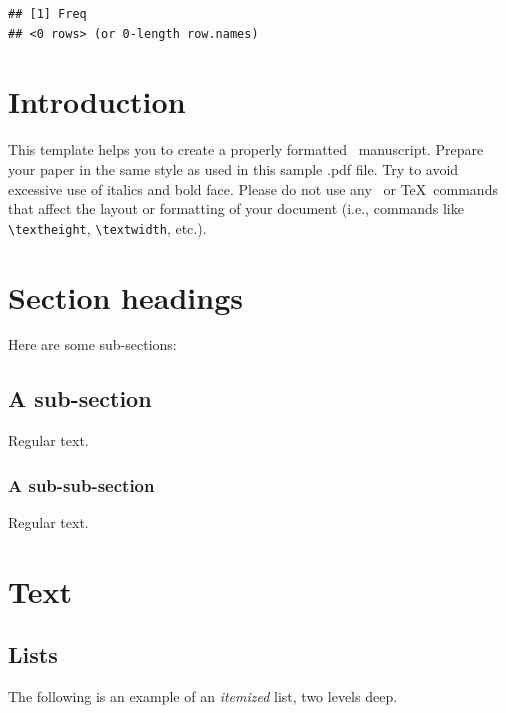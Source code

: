 \documentclass[aoas]{imsart}
\numberwithin{equation}{section}
\theoremstyle{plain}
\theoremstyle{remark}
\begin{document}
\begin{verbatim}
## [1] Freq
## <0 rows> (or 0-length row.names)
\end{verbatim}

\newpage

\hypertarget{introduction}{%
\section{Introduction}\label{introduction}}

This template helps you to create a properly formatted
\LaTeXe~manuscript. Prepare your paper in the same style as used in this
sample .pdf file. Try to avoid excessive use of italics and bold face.
Please do not use any \LaTeXe~or \TeX~commands that affect the layout or
formatting of your document (i.e., commands like \verb|\textheight|,
\verb|\textwidth|, etc.).

\hypertarget{section-headings}{%
\section{Section headings}\label{section-headings}}

Here are some sub-sections:

\hypertarget{a-sub-section}{%
\subsection{A sub-section}\label{a-sub-section}}

Regular text.

\hypertarget{a-sub-sub-section}{%
\subsubsection{A sub-sub-section}\label{a-sub-sub-section}}

Regular text.

\hypertarget{text}{%
\section{Text}\label{text}}

\hypertarget{lists}{%
\subsection{Lists}\label{lists}}

The following is an example of an \emph{itemized} list, two levels deep.
\end{document}
